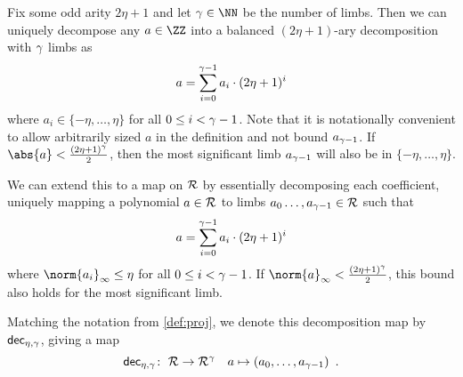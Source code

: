 \begin{definition}
    Fix some odd arity $2\eta+1$ and let $\limbs\in\NN$ be the number of limbs.
    Then we can uniquely decompose any $a\in\ZZ$ into a balanced $(2\eta+1)$-ary decomposition with $\gamma$ limbs as
    \[
     a = \sum_{i=0}^{\gamma-1} a_i \cdot (2\eta+1)^i
    \]
    where $a_i \in \{-\eta,\ldots, \eta\}$ for all $0\leq i <\gamma-1$.
    Note that it is notationally convenient to allow arbitrarily sized $a$ in the definition and not bound $a_{\gamma-1}$.
    If $\abs{a} < \tfrac{(2\eta+1)^\limbs}{2}$, then the most significant limb $a_{\gamma-1}$ will also be in $\{-\eta,\ldots,\eta\}$.
    
    We can extend this to a map on $\mathcal{R}$ by essentially decomposing each coefficient, uniquely mapping a polynomial $a\in\mathcal{R}$ to limbs $a_0\ldots,a_{\gamma-1}\in \mathcal{R}$ such that
    \[
     a = \sum_{i=0}^{\gamma-1} a_i \cdot (2\eta+1)^i
    \]
    where $\norm{a_i}_{\infty} \leq \eta$ for all $0\leq i < \gamma-1$. If $\norm{a}_{\infty} < \tfrac{(2\eta+1)^\limbs}{2}$, this bound also holds for the most significant limb.
    
    Matching the notation from \autoref{def:proj}, we denote this decomposition map by $\mathsf{dec}_{\eta,\gamma}$, giving a map
    \[
     \mathsf{dec}_{\eta,\gamma} \colon\; \mathcal{R} \to \mathcal{R}^{\gamma}\quad a \mapsto (a_0,\ldots,a_{\gamma-1})\enspace.
    \]
\end{definition}
